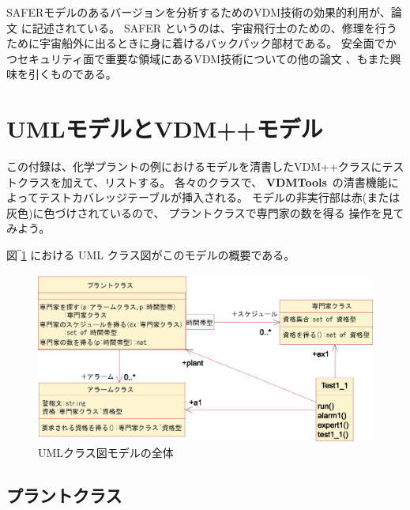 \documentclass[\pformat,12pt,twoside]{jarticle}
\newcommand{\vdmtools}{\textbf{VDMTools}}
\begin{document}
SAFERモデルのあるバージョンを分析するためのVDM技術の効果的利用が、論文 \cite{Agerholm&97c,Agerholm&99}に記述されている。
SAFER というのは、宇宙飛行士のための、修理を行うために宇宙船外に出るときに身に着けるバックパック部材である。
安全面でかつセキュリティ面で重要な領域にあるVDM技術についての他の論文 \cite{Agerholm&98a,Larsen&96a}、もまた興味を引くものである。





\newpage
\appendix
\section{UMLモデルとVDM++モデル}


この付録は、化学プラントの例におけるモデルを清書したVDM++クラスにテストクラスを加えて、リストする。
各々のクラスで、 \vdmtools\ の清書機能によってテストカバレッジテーブルが挿入される。
モデルの非実行部は赤(または灰色)に色づけされているので、 プラントクラスで専門家の数を得る 操作を見てみよう。

 図‾\ref{fig:fulldiagram} における UML クラス図がこのモデルの概要である。

\begin{figure}[htb]
\begin{center}
\includegraphics[width=5.967in]{fulldiagram}
\caption{UMLクラス図モデルの全体 \label{fig:fulldiagram}}
\end{center}
\end{figure}

\subsection{プラントクラス}
\end{document}
